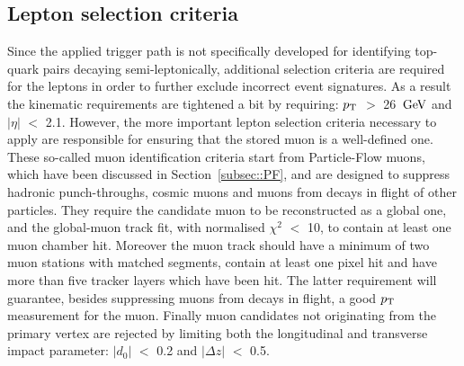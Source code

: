 \subsection{Lepton selection criteria}
Since the applied trigger path is not specifically developed for identifying top-quark pairs decaying semi-leptonically, additional selection criteria are required for the leptons in order to further exclude incorrect event signatures. As a result the kinematic requirements are tightened a bit by requiring: $p_{\rm T}$ $>$ 26 $\, \mathrm{GeV}$ and $\vert \eta \vert$ $<$ 2.1.
However, the more important lepton selection criteria necessary to apply are responsible for ensuring that the stored muon is a well-defined one.
\\
These so-called muon identification criteria start from Particle-Flow muons, which have been discussed in Section~\ref{subsec::PF}, and are designed to suppress hadronic punch-throughs, cosmic muons and muons from decays in flight of other particles.
They require the candidate muon to be reconstructed as a global one, and the global-muon track fit, with normalised $\chi^{2}$ $<$ 10, to contain at least one muon chamber hit.
Moreover the muon track should have a minimum of two muon stations with matched segments, contain at least one pixel hit and have more than five tracker layers which have been hit. The latter requirement will guarantee, besides suppressing muons from decays in flight, a good $p_{\rm T}$ measurement for the muon.
Finally muon candidates not originating from the primary vertex are rejected by limiting both the longitudinal and transverse impact parameter: $\vert d_0 \vert$ $<$ 0.2 and $\vert \Delta z \vert$ $<$ 0.5.

